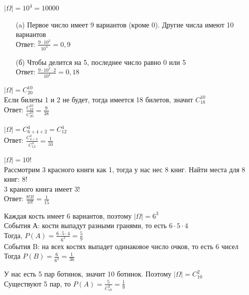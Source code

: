 \begin{exercise}[6]
	$| \Omega | = 10^4=10000$
	\begin{enumerate}
		\item [(a)] Первое число имеет 9 вариантов (кроме 0). Другие числа имеют 10 вариантов \\ Ответ: $\frac{9 \cdot 10^3}{10^4} = 0,9$
		\item [(б)] Чтобы делится на 5, последнее число равно 0 или 5 \\ Ответ: $\frac{9 \cdot 10^2 \cdot 2}{10^4} = 0,18$
	\end{enumerate}
\end{exercise}

\begin{exercise}[7]
	$| \Omega | = C^{10}_{20}$ \\ Если билеты 1 и 2 не будет, тогда имеется 18 билетов, значит $C^{10}_{18}$ \\ Ответ: $\frac{C^{10}_{18}}{C^{10}_{20}} = \frac{9}{38}$
\end{exercise}

\begin{exercise}[8]
	$| \Omega | = C^4_{6+4+2} = C^4_{12}$ \\ Ответ: $\frac{C^4_{4+2}}{C^4_{12}} = \frac{1}{33}$
\end{exercise}

\begin{exercise}[9]
	$| \Omega | = 10!$ \\ 
	Рассмотрим 3 красного книги как 1, тогда у нас нес 8 книг. Найти места для 8 книг: $8!$ \\ 3 краного книга имеет $3!$ \\ Ответ: $\frac{8! 3!}{10!} = \frac{1}{15}$
\end{exercise}

\begin{exercise}[10]
	Каждая кость имеет 6 вариантов, поэтому $| \Omega | = 6^3$ \\ События А: кости выпадут разными гранями, то есть $6 \cdot 5 \cdot 4$ \\ Тогда, $P(A) = \frac{6 \cdot 5 \cdot 4}{6^3} = \frac{5}{9}$ \\ События B: на всех костях выпадет одинаковое число очков, то есть 6 чисел \\ Тогда $P(B) = \frac{6}{6^3} = \frac{1}{36}$
\end{exercise}

\begin{exercise}[11]
	У нас есть 5 пар ботинок, значит 10 ботинок. Поэтому $| \Omega | = C^2_{10}$ \\ Существуют 5 пар, то $P(A) = \frac{5}{C^2_{10}} = \frac{1}{9}$
\end{exercise}

